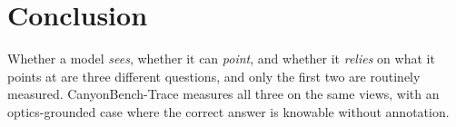 \section{Conclusion}
Whether a model \emph{sees}, whether it can \emph{point}, and whether it
\emph{relies} on what it points at are three different questions, and only the
first two are routinely measured. CanyonBench-Trace measures all three on the
same views, with an optics-grounded case where the correct answer is knowable
without annotation.
